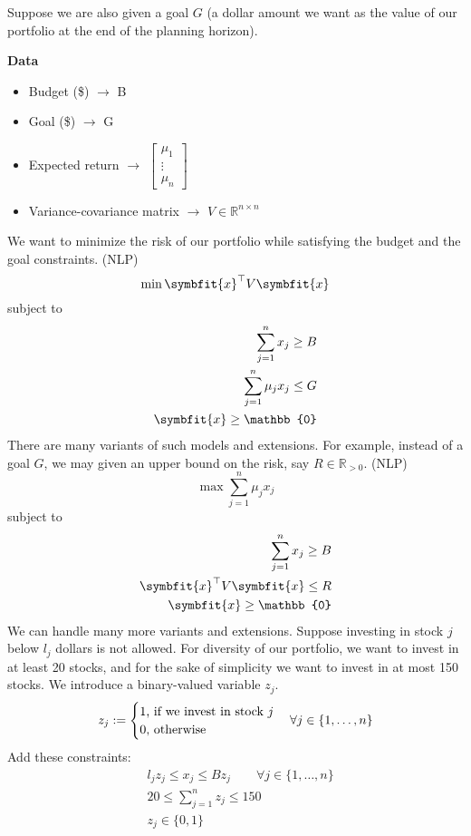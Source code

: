 Suppose we are also given a goal $G$ (a dollar amount we want as the value
of our portfolio at the end of the planning horizon).

\textbf{Data}
\begin{itemize}
    \item Budget (\$) $\rightarrow$ B
    \item Goal (\$) $\rightarrow$ G
    \item Expected return $\rightarrow$
    $\begin{bmatrix}
        \mu_1\\
        \vdots\\
        \mu_n
    \end{bmatrix}$
    \item Variance-covariance matrix $\rightarrow$ 
    $V\in \mathbb{R}^{n\times n}$
\end{itemize}
We want to minimize the risk of our portfolio while satisfying the budget and
the goal constraints. (NLP)
\[\min \symbfit{x}^\top  V\symbfit{x}\]
subject to
\begin{align*}
    \sum_{j = 1}^{n}x_j\ge B\\
    \sum_{j = 1}^{n}\mu_jx_j\le G\\
    \symbfit{x}\ge \mathbb{0}
\end{align*}
There are many variants of such models and extensions. For example, instead
of a goal $G$, we may given an upper bound on the risk, say 
$R\in\mathbb{R}_{>0}$. (NLP)
\[\max \sum_{j = 1}^{n}\mu_jx_j\]
subject to
\begin{align*}
    \sum_{j = 1}^{n}x_j\ge B\\
    \symbfit{x}^\top  V\symbfit{x}\le R\\
    \symbfit{x}\ge \mathbb{0}
\end{align*}
We can handle many more variants and extensions. Suppose investing in stock
$j$ below $l_j$ dollars is not allowed. For diversity of our portfolio, we
want to invest in at least 20 stocks, and for the sake of simplicity we want
to invest in at most 150 stocks. We introduce a binary-valued variable $z_j$.
\[z_j:=
\begin{cases}
    1 \text{, if we invest in stock $j$}\\
    0 \text{, otherwise}
\end{cases}
\forall j\in\{1,\dots,n\}\\
\]
Add these constraints:
\begin{align*}
    &l_jz_j\le x_j\le Bz_j\qquad \forall j\in\{1,\dots,n\}\\
    &20\le \sum_{j = 1}^{n}z_j\le 150\\
    &z_j\in\{0,1\}
\end{align*}